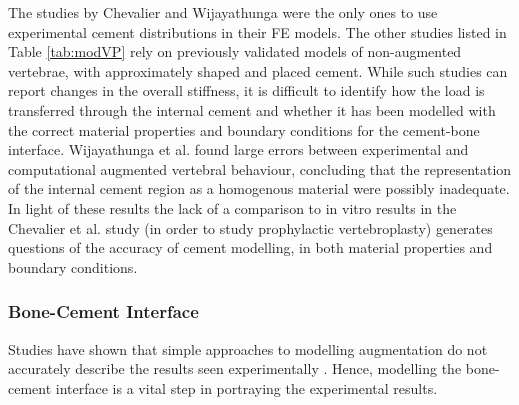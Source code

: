 The studies by Chevalier \cite{Chevalier2008} and Wijayathunga
\cite{Wijayathunga2008} were
the
only ones to use experimental cement distributions in their FE
models. The other studies listed in Table \ref{tab:modVP} rely on
previously validated
models of non-augmented vertebrae, with approximately shaped and placed
cement. While such studies can report changes in the overall stiffness,
it is difficult to identify how the load is transferred through the
internal cement and whether it has been modelled with the correct
material properties and boundary conditions for the cement-bone
interface. Wijayathunga et al. \cite{Wijayathunga2008} found large errors
between
experimental and computational augmented vertebral behaviour, concluding
that the representation of the internal cement region as a homogenous
material were possibly inadequate. In light of these results the lack of
a comparison to in vitro results in the Chevalier et al. \cite{Chevalier2008}
study
(in order to study prophylactic vertebroplasty) generates questions of
the accuracy of cement modelling, in both material properties and
boundary conditions.

\subsubsection{Bone-Cement Interface}\label{bone-cement-interface}

Studies have shown that simple approaches to modelling augmentation do not accurately describe the results seen experimentally \cite{Wijayathunga2008}. Hence, modelling the bone-cement interface is a vital step in portraying the experimental results.

